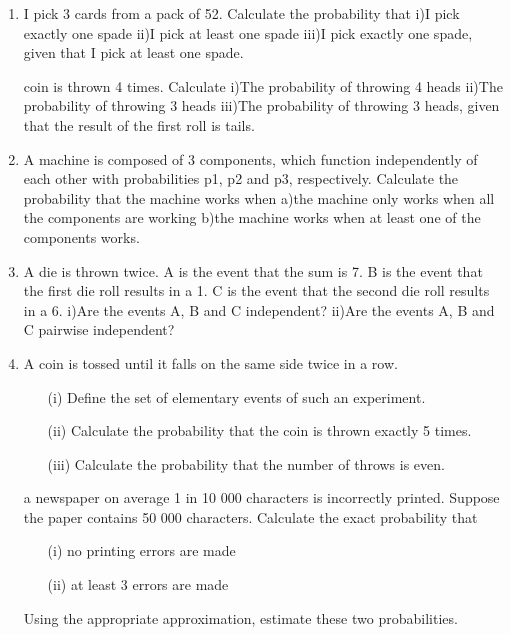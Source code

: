 \documentclass[a4paper,12pt]{article}
\begin{document}
\begin{enumerate}
\item I pick 3 cards from a pack of 52. Calculate the probability that 
i)I pick exactly one spade
ii)I pick at least one spade
iii)I pick exactly one spade, given that I pick at least one spade.


\itemA coin is thrown 4 times. Calculate 
i)The probability of throwing 4 heads
ii)The probability of throwing 3 heads 
iii)The probability of throwing 3 heads, given that the result of the first roll is tails.


\item A machine is composed of 3 components, which function independently of each other with probabilities p1, p2 and p3, respectively. Calculate the probability that the machine works when
a)the machine only works when all the components are working
b)the machine works when at least one of the components works.

\item  A die is thrown twice. A is the event that the sum is 7. B is the event that the first die roll results in a 1. C is the event that the second die roll results in a 6. 
i)Are the events A, B and C independent?
ii)Are the events A, B and C pairwise independent?
\item A coin is tossed until it falls on the same side twice in a row.
\begin{itemize}
\item[(i)] Define the set of elementary events of such an experiment.
\item[(ii)]  Calculate the probability that the coin is thrown exactly 5 times.
\item[(iii)]  Calculate the probability that the number of throws is even.
\end{itemize}
\itemIn a newspaper on average 1 in 10 000 characters is incorrectly printed. Suppose the paper contains 50 000 characters. Calculate the exact probability that 
 \begin{itemize}
\item[(i)]no printing errors are made
\item[(ii)]at least 3 errors are made
 \end{itemize}
Using the appropriate approximation, estimate these two probabilities. 


\end{enumerate}
\end{document}
